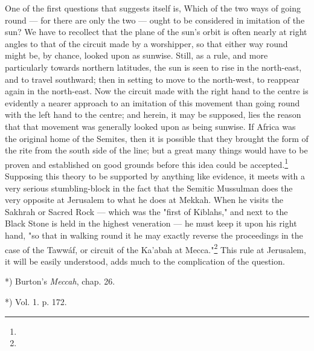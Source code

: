 \documentclass[a4paper, 11pt, oneside, polutonikogreek, english]{article}
\begin{document}
One of the first questions that suggests itself is, Which of the two ways of going round --- for there are only the two --- ought to be considered in imitation of the sun? We have to recollect that the plane of the sun's orbit is often nearly at right angles to that of the circuit made by a worshipper, so that either way round might be, by chance, looked upon as sunwise. Still, as a rule, and more particularly towards northern latitudes, the sun is seen to rise in the north-east, and to travel southward; then in setting to move to the north-west, to reappear again in the north-east. Now the circuit made with the right hand to the centre is evidently a nearer approach to an imitation of this movement than going round with the left hand to the centre; and herein, it may be supposed, lies the reason that that movement was generally looked upon as being sunwise. If Africa was the original home of the Semites, then it is possible that they brought the form of the rite from the south side of the line; but a great many things would have to be proven and established on good grounds before this idea could be accepted.\footnote{} Supposing this theory to be supported by anything like evidence, it meets with a very serious stumbling-block in the fact that the Semitic Mussulman does the very opposite at Jerusalem to what he does at Mekkah. When he visits the Sakhrah or Sacred Rock --- which was the "first of Kiblahs," and next to the Black Stone is held in the highest veneration --- he must keep it upon his right hand, "so that in walking round it he may exactly reverse the proceedings in the case of the Tawwáf, or circuit of the Ka'abah at Mecca."\footnote{} This rule at Jerusalem, it will be easily understood, adds much to the complication of the question.

*) Burton's \emph{Meccah}, chap. 26.

*) Vol. 1. p. 172.
\end{document}
